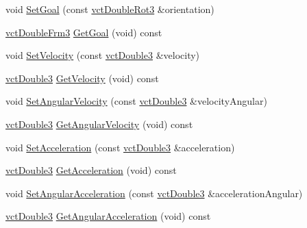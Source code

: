 \begin{DoxyCompactItemize}
\item 
void \hyperlink{classprm_position_cartesian_set_a1eacb92ecdabd989409a8bcc6722bae6}{Set\+Goal} (const \hyperlink{vct_transformation_types_8h_ade4308c597095f786fada3decdcbd7c3}{vct\+Double\+Rot3} \&orientation)
\item 
\hyperlink{vct_transformation_types_8h_acc33ebdc1b58783aa59508c7b5200b56}{vct\+Double\+Frm3} \hyperlink{classprm_position_cartesian_set_ae3aaa8e5c1cf147994ce754fe4b50926}{Get\+Goal} (void) const 
\item 
void \hyperlink{classprm_position_cartesian_set_afab9eb04396864bbcbc3f71c681cf4d0}{Set\+Velocity} (const \hyperlink{vct_fixed_size_vector_types_8h_a4a89122c9d7f72c3f31fe8126e17c3af}{vct\+Double3} \&velocity)
\item 
\hyperlink{vct_fixed_size_vector_types_8h_a4a89122c9d7f72c3f31fe8126e17c3af}{vct\+Double3} \hyperlink{classprm_position_cartesian_set_ab65fa0a5570e107274b8a5f20edf27f0}{Get\+Velocity} (void) const 
\item 
void \hyperlink{classprm_position_cartesian_set_a3af1e877b5ecaa21d516d844715b97c3}{Set\+Angular\+Velocity} (const \hyperlink{vct_fixed_size_vector_types_8h_a4a89122c9d7f72c3f31fe8126e17c3af}{vct\+Double3} \&velocity\+Angular)
\item 
\hyperlink{vct_fixed_size_vector_types_8h_a4a89122c9d7f72c3f31fe8126e17c3af}{vct\+Double3} \hyperlink{classprm_position_cartesian_set_a2b773b4789abbccd39541883f23d7f1e}{Get\+Angular\+Velocity} (void) const 
\item 
void \hyperlink{classprm_position_cartesian_set_aa4d1e6e0e540d66b99f4a363f56ee8e1}{Set\+Acceleration} (const \hyperlink{vct_fixed_size_vector_types_8h_a4a89122c9d7f72c3f31fe8126e17c3af}{vct\+Double3} \&acceleration)
\item 
\hyperlink{vct_fixed_size_vector_types_8h_a4a89122c9d7f72c3f31fe8126e17c3af}{vct\+Double3} \hyperlink{classprm_position_cartesian_set_ada89cbe0f54d97981def5d3e1e11844f}{Get\+Acceleration} (void) const 
\item 
void \hyperlink{classprm_position_cartesian_set_a376823514584dae81ad1beda00739b02}{Set\+Angular\+Acceleration} (const \hyperlink{vct_fixed_size_vector_types_8h_a4a89122c9d7f72c3f31fe8126e17c3af}{vct\+Double3} \&acceleration\+Angular)
\item 
\hyperlink{vct_fixed_size_vector_types_8h_a4a89122c9d7f72c3f31fe8126e17c3af}{vct\+Double3} \hyperlink{classprm_position_cartesian_set_a907a637dc92362275905111e36220595}{Get\+Angular\+Acceleration} (void) const 
\item 

\end{DoxyCompactItemize}
